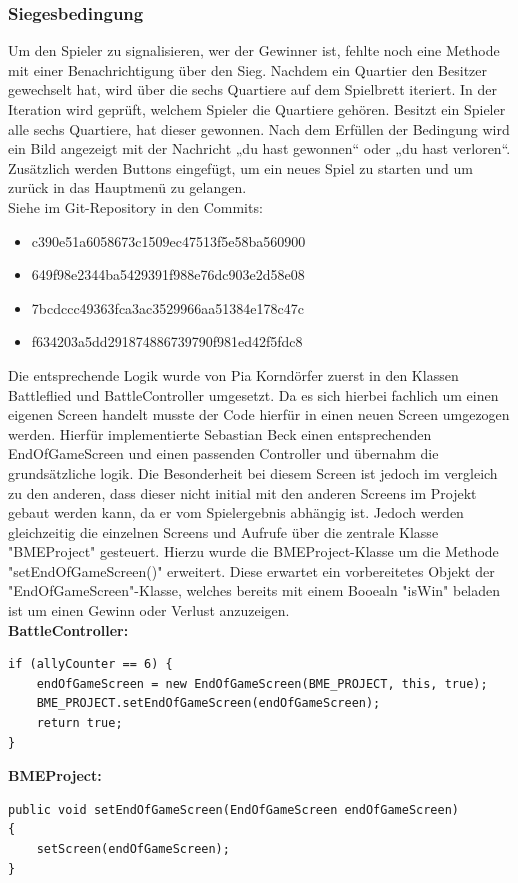 \subsubsection{Siegesbedingung}
Um den Spieler zu signalisieren, wer der Gewinner ist, fehlte noch eine Methode mit einer Benachrichtigung über den Sieg. Nachdem ein Quartier den Besitzer gewechselt hat, wird über die sechs Quartiere auf dem Spielbrett iteriert. In der Iteration wird geprüft, welchem Spieler die Quartiere gehören. Besitzt ein Spieler alle sechs Quartiere, hat dieser gewonnen. Nach dem Erfüllen der Bedingung wird ein Bild angezeigt mit der Nachricht „du hast gewonnen“ oder „du hast verloren“. Zusätzlich werden Buttons eingefügt,  um ein neues Spiel zu starten und um zurück in das Hauptmenü zu gelangen. \\
Siehe im Git-Repository in den Commits:
\begin{itemize}
\item c390e51a6058673c1509ec47513f5e58ba560900
\item 649f98e2344ba5429391f988e76dc903e2d58e08
\item 7bcdccc49363fca3ac3529966aa51384e178c47c
\item f634203a5dd291874886739790f981ed42f5fdc8
\end{itemize}

Die entsprechende Logik wurde von Pia Korndörfer zuerst in den Klassen Battleflied und BattleController umgesetzt. Da es sich hierbei fachlich um einen eigenen Screen handelt musste der Code hierfür in einen neuen Screen umgezogen werden. Hierfür implementierte Sebastian Beck einen entsprechenden EndOfGameScreen und einen passenden Controller und übernahm die grundsätzliche logik. Die Besonderheit bei diesem Screen ist jedoch im vergleich zu den anderen, dass dieser nicht initial mit den anderen Screens im Projekt gebaut werden kann, da er vom Spielergebnis abhängig ist. Jedoch werden gleichzeitig die einzelnen Screens und Aufrufe über die zentrale Klasse "BMEProject" gesteuert. Hierzu wurde die BMEProject-Klasse um die Methode "setEndOfGameScreen()" erweitert. Diese erwartet ein vorbereitetes Objekt der "EndOfGameScreen"-Klasse, welches bereits mit einem Booealn "isWin" beladen ist um einen Gewinn oder Verlust anzuzeigen. \\
\textbf{BattleController:}
\begin{lstlisting}
if (allyCounter == 6) {
	endOfGameScreen = new EndOfGameScreen(BME_PROJECT, this, true);
	BME_PROJECT.setEndOfGameScreen(endOfGameScreen);
	return true;
}
\end{lstlisting}
\textbf{BMEProject:}
\begin{lstlisting}
public void setEndOfGameScreen(EndOfGameScreen endOfGameScreen)
{
	setScreen(endOfGameScreen);
}
\end{lstlisting}

